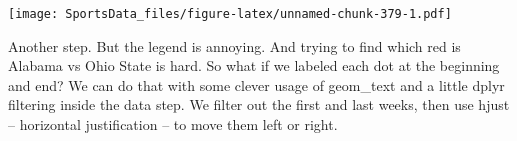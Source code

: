 \documentclass[
]{book}
\newenvironment{Shaded}{\begin{snugshade}}{\end{snugshade}}
\newcommand{\DataTypeTok}[1]{\textcolor[rgb]{0.13,0.29,0.53}{#1}}
\newcommand{\DecValTok}[1]{\textcolor[rgb]{0.00,0.00,0.81}{#1}}
\newcommand{\FloatTok}[1]{\textcolor[rgb]{0.00,0.00,0.81}{#1}}
\newcommand{\KeywordTok}[1]{\textcolor[rgb]{0.13,0.29,0.53}{\textbf{#1}}}
\newcommand{\NormalTok}[1]{#1}
\newcommand{\OperatorTok}[1]{\textcolor[rgb]{0.81,0.36,0.00}{\textbf{#1}}}
\newcommand{\StringTok}[1]{\textcolor[rgb]{0.31,0.60,0.02}{#1}}
\begin{document}
\texttt{[image: SportsData\_files/figure-latex/unnamed-chunk-379-1.pdf]}

Another step. But the legend is annoying. And trying to find which red is Alabama vs Ohio State is hard. So what if we labeled each dot at the beginning and end? We can do that with some clever usage of geom\_text and a little dplyr filtering inside the data step. We filter out the first and last weeks, then use hjust -- horizontal justification -- to move them left or right.

\begin{Shaded}
\end{Shaded}
\end{document}
